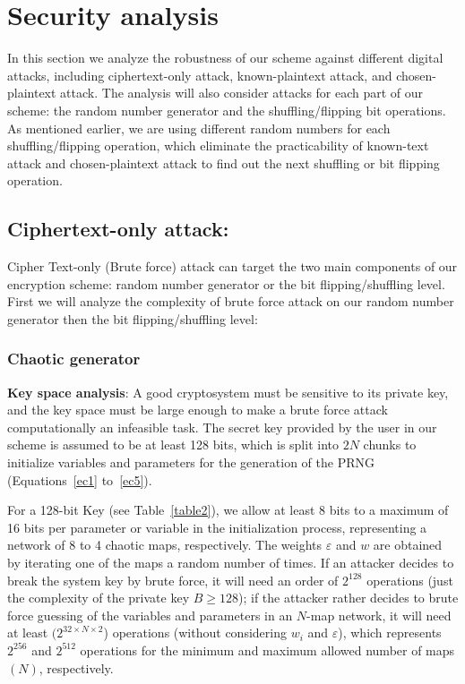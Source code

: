 \documentclass[preprint]{elsarticle}
\begin{document}
\section{Security analysis}
\label{secSecurity}
In this section we analyze the robustness of our scheme against different digital attacks, including ciphertext-only attack, known-plaintext attack, and chosen-plaintext attack. The analysis will also consider attacks for each part of our scheme: the random number generator and the shuffling/flipping bit operations. As mentioned earlier, we are using different random numbers for each shuffling/flipping operation, which eliminate the practicability of known-text attack and chosen-plaintext attack to find out the next shuffling or bit flipping operation. 



\subsection{Ciphertext-only attack:}
Cipher Text-only (Brute force) attack can target the two main components of our encryption scheme: random number generator or the bit flipping/shuffling level. First we will analyze the complexity of brute force attack on our random number generator then the bit flipping/shuffling level:


\subsubsection{Chaotic generator}
\textbf{Key space analysis}: A good cryptosystem must be sensitive to its private key, and the key space must be large enough to make a brute force attack computationally an infeasible task.  The secret key provided by the user in our scheme is assumed to be at least 128 bits, which is split into $2N$ chunks to initialize variables and parameters for the generation of the PRNG (Equations~\ref{ec1} to~\ref{ec5}).

For a 128-bit Key (see Table~\ref{table2}), we allow at least 8 bits to a maximum of 16 bits per parameter or variable in the initialization process, representing a network of 8 to 4 chaotic maps, respectively. The weights $\varepsilon$ and $w$ are obtained by iterating one of the maps a random number of times. If an attacker decides to break the system key by brute force, it will need an order of $2^{128}$ operations (just the complexity of the private key $B \geq 128$); if the attacker rather decides to brute force guessing of the variables and parameters in an $N$-map network, it will need at least $(2^{32\times N \times 2}$) operations (without considering $w_{i}$ and $\varepsilon$), which represents $2^{256}$ and $2^{512}$ operations for the minimum and maximum allowed number of maps $(N)$, respectively. 
\end{document}
